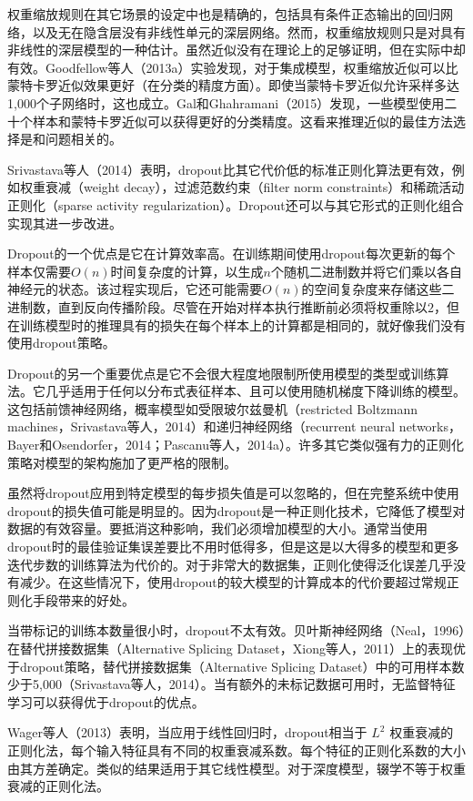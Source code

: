 权重缩放规则在其它场景的设定中也是精确的，包括具有条件正态输出的回归网络，以及无在隐含层没有非线性单元的深层网络。然而，权重缩放规则只是对具有非线性的深层模型的一种估计。虽然近似没有在理论上的足够证明，但在实际中却有效。Goodfellow等人（2013a）实验发现，对于集成模型，权重缩放近似可以比蒙特卡罗近似效果更好（在分类的精度方面）。即使当蒙特卡罗近似允许采样多达1,000个子网络时，这也成立。Gal和Ghahramani（2015）发现，一些模型使用二十个样本和蒙特卡罗近似可以获得更好的分类精度。这看来推理近似的最佳方法选择是和问题相关的。

Srivastava等人（2014）表明，dropout比其它代价低的标准正则化算法更有效，例如权重衰减（weight decay），过滤范数约束（filter norm constraints）和稀疏活动正则化（sparse activity regularization）。Dropout还可以与其它形式的正则化组合实现其进一步改进。

Dropout的一个优点是它在计算效率高。在训练期间使用dropout每次更新的每个样本仅需要$O(n)$时间复杂度的计算，以生成$n$个随机二进制数并将它们乘以各自神经元的状态。该过程实现后，它还可能需要$O(n)$的空间复杂度来存储这些二进制数，直到反向传播阶段。尽管在开始对样本执行推断前必须将权重除以$2$，但在训练模型时的推理具有的损失在每个样本上的计算都是相同的，就好像我们没有使用dropout策略。

Dropout的另一个重要优点是它不会很大程度地限制所使用模型的类型或训练算法。它几乎适用于任何以分布式表征样本、且可以使用随机梯度下降训练的模型。这包括前馈神经网络，概率模型如受限玻尔兹曼机（restricted Boltzmann machines，Srivastava等人，2014）和递归神经网络（recurrent neural networks，Bayer和Osendorfer，2014；Pascanu等人，2014a）。许多其它类似强有力的正则化策略对模型的架构施加了更严格的限制。

虽然将dropout应用到特定模型的每步损失值是可以忽略的，但在完整系统中使用dropout的损失值可能是明显的。因为dropout是一种正则化技术，它降低了模型对数据的有效容量。要抵消这种影响，我们必须增加模型的大小。通常当使用dropout时的最佳验证集误差要比不用时低得多，但是这是以大得多的模型和更多迭代步数的训练算法为代价的。对于非常大的数据集，正则化使得泛化误差几乎没有减少。在这些情况下，使用dropout的较大模型的计算成本的代价要超过常规正则化手段带来的好处。

当带标记的训练本数量很小时，dropout不太有效。贝叶斯神经网络（Neal，1996）在替代拼接数据集（Alternative Splicing Dataset，Xiong等人，2011）上的表现优于dropout策略，替代拼接数据集（Alternative Splicing Dataset）中的可用样本数少于5,000（Srivastava等人，2014）。当有额外的未标记数据可用时，无监督特征学习可以获得优于dropout的优点。

Wager等人（2013）表明，当应用于线性回归时，dropout相当于 $L^2$ 权重衰减的正则化法，每个输入特征具有不同的权重衰减系数。每个特征的正则化系数的大小由其方差确定。类似的结果适用于其它线性模型。对于深度模型，辍学不等于权重衰减的正则化法。

